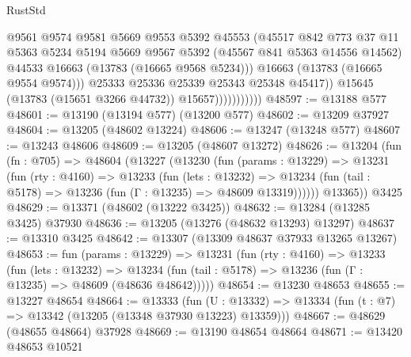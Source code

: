 \begin{lexlean}{RustStd}
\begin{coremodule}
                                @9561
                                @9574
                                @9581
                                @5669
                                @9553
                                @5392
                                @45553
                                (@45517
                                  @842
                                  @773
                                  @37
                                  @11
                                  @5363
                                  @5234
                                  @5194
                                  @5669
                                  @9567
                                  @5392
                                  (@45567 @841 @5363 @14556 @14562)
                                  @44533
                                  @16663
                                  (@13783 (@16665 @9568 @5234)))
                                @16663
                                (@13783 (@16665 @9554 @9574)))
                              @25333
                              @25336
                              @25339
                              @25343
                              @25348
                              @45417))
                          @15645
                          (@13783 (@15651 @3266 @44732))
                          @15657)))))))))))
@48597 := @13188 @577
@48601 := @13190 (@13194 @577) (@13200 @577)
@48602 := @13209 @37927
@48604 := @13205 (@48602 @13224)
@48606 := @13247 (@13248 @577)
@48607 := @13243 @48606
@48609 := @13205 (@48607 @13272)
@48626 := @13204
    (fun (fn : @705) =>
    @48604
      (@13227
        (@13230
          (fun (params : @13229) =>
          @13231
            (fun (rty : @4160) =>
            @13233
              (fun (lets : @13232) =>
              @13234 (fun (tail : @5178) => @13236 (fun (Γ : @13235) => @48609 @13319))))))
        @13365))
    @3425
@48629 := @13371 (@48602 (@13222 @3425))
@48632 := @13284 (@13285 @3425) @37930
@48636 := @13205 (@13276 (@48632 @13293) @13297)
@48637 := @13310 @3425
@48642 := @13307 (@13309 @48637 @37933 @13265 @13267)
@48653 := fun (params : @13229) =>
  @13231
    (fun (rty : @4160) =>
    @13233
      (fun (lets : @13232) =>
      @13234 (fun (tail : @5178) => @13236 (fun (Γ : @13235) => @48609 (@48636 @48642)))))
@48654 := @13230 @48653
@48655 := @13227 @48654
@48664 := @13333
    (fun (U : @13332) => @13334 (fun (t : @7) => @13342 (@13205 (@13348 @37930 @13223) @13359)))
@48667 := @48629 (@48655 @48664) @37928
@48669 := @13190 @48654 @48664
@48671 := @13420 @48653 @10521

\end{coremodule}
\end{lexlean}
